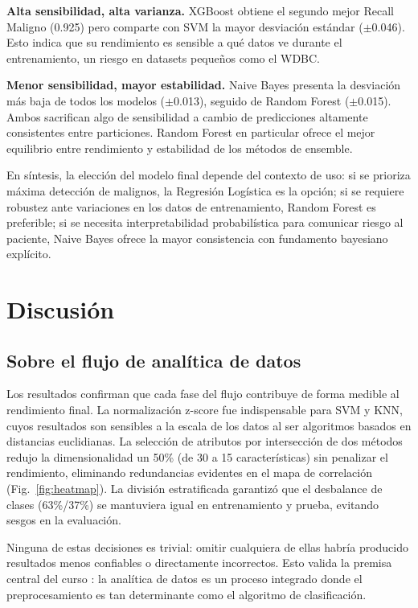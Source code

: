 \documentclass[journal]{IEEEtran}
\begin{document}
\textbf{Alta sensibilidad, alta varianza.} XGBoost obtiene el
segundo mejor Recall Maligno (0.925) pero comparte con SVM la
mayor desviación estándar ($\pm$0.046). Esto indica que su
rendimiento es sensible a qué datos ve durante el entrenamiento,
un riesgo en datasets pequeños como el WDBC.

\textbf{Menor sensibilidad, mayor estabilidad.} Naive Bayes
presenta la desviación más baja de todos los modelos
($\pm$0.013), seguido de Random Forest ($\pm$0.015). Ambos
sacrifican algo de sensibilidad a cambio de predicciones
altamente consistentes entre particiones. Random Forest en
particular ofrece el mejor equilibrio entre rendimiento y
estabilidad de los métodos de ensemble.

En síntesis, la elección del modelo final depende del contexto
de uso: si se prioriza máxima detección de malignos,
la Regresión Logística es la opción; si se requiere robustez
ante variaciones en los datos de entrenamiento, Random Forest
es preferible; si se necesita interpretabilidad probabilística
para comunicar riesgo al paciente, Naive Bayes ofrece la mayor
consistencia con fundamento bayesiano explícito.
\section{Discusión}

\subsection{Sobre el flujo de analítica de datos}
Los resultados confirman que cada fase del flujo contribuye
de forma medible al rendimiento final. La normalización
z-score fue indispensable para SVM y KNN, cuyos resultados
son sensibles a la escala de los datos al ser algoritmos
basados en distancias euclidianas. La selección de atributos
por intersección de dos métodos redujo la dimensionalidad un
50\% (de 30 a 15 características) sin penalizar el rendimiento,
eliminando redundancias evidentes en el mapa de correlación
(Fig.~\ref{fig:heatmap}). La división estratificada garantizó
que el desbalance de clases (63\%/37\%) se mantuviera igual
en entrenamiento y prueba, evitando sesgos en la evaluación.

Ninguna de estas decisiones es trivial: omitir cualquiera de
ellas habría producido resultados menos confiables o
directamente incorrectos. Esto valida la premisa central del
curso \cite{curso_ud}: la analítica de datos es un proceso
integrado donde el preprocesamiento es tan determinante como
el algoritmo de clasificación.
\end{document}
